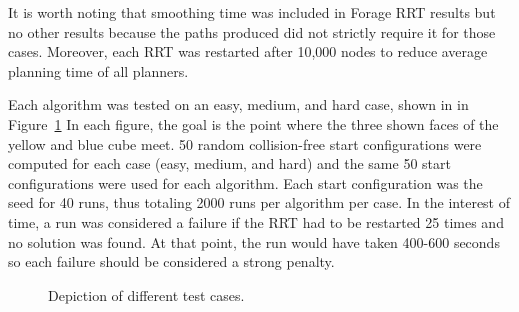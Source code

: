 \documentclass[conference]{IEEEtran}
\begin{document}
It is worth noting that smoothing time was included in Forage RRT results but no other results because the paths produced did not strictly
require it for those cases. Moreover, each RRT was restarted after 10,000 nodes to reduce average planning time of all planners.

Each algorithm was tested on an easy, medium, and hard case, shown in in Figure~\ref{fig:cases} In each figure, the goal is the point where
the three shown faces of the yellow and blue cube meet. 50 random collision-free start configurations were computed for each case (easy,
medium, and hard) and the same 50 start configurations were used for each algorithm. Each start configuration was the seed for 40 runs, thus
totaling 2000 runs per algorithm per case. In the interest of time, a run was considered a failure if the RRT had to be restarted 25 times
and no solution was found. At that point, the run would have taken 400-600 seconds so each failure should be considered a strong penalty. 

\begin{figure}[t]
  \label{fig:cases}
  \centering
    \caption{Depiction of different test cases.}
\end{figure}
\end{document}
